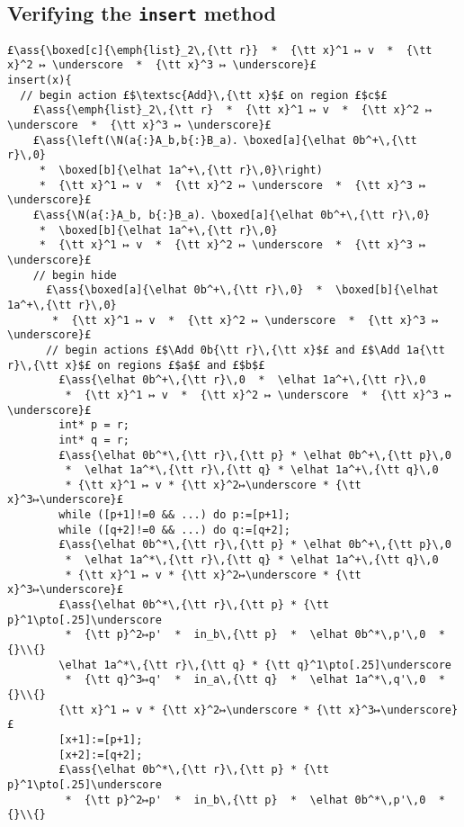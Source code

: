 \documentclass[12pt,a4paper]{article}
\makeatletter
\newcommand{\ml}[2][t]{\mbox{\mdseries\begin{tabular}[#1]{@{}L@{}}#2\end{tabular}}}
\newcommand{\ass}[1]{\ensuremath{{\color{blue}\left\{\ml[c]{#1}\right\}}}}
\renewcommand{\boxed}[2][]{{\textbf{[}}#2{\textbf{]}}_{#1}}
\makeatother
\begin{document}
\subsection{Verifying the {\tt insert} method}

\begin{lstlisting}
£\ass{\boxed[c]{\emph{list}_2\,{\tt r}}  *  {\tt x}^1 ↦ v  *  {\tt x}^2 ↦ \underscore  *  {\tt x}^3 ↦ \underscore}£
insert(x){
  // begin action £$\textsc{Add}\,{\tt x}$£ on region £$c$£ 
    £\ass{\emph{list}_2\,{\tt r}  *  {\tt x}^1 ↦ v  *  {\tt x}^2 ↦ \underscore  *  {\tt x}^3 ↦ \underscore}£
    £\ass{\left(\N(a{:}A_b,b{:}B_a)．\boxed[a]{\elhat 0b^+\,{\tt r}\,0} 
     *  \boxed[b]{\elhat 1a^+\,{\tt r}\,0}\right) 
     *  {\tt x}^1 ↦ v  *  {\tt x}^2 ↦ \underscore  *  {\tt x}^3 ↦ \underscore}£
    £\ass{\N(a{:}A_b, b{:}B_a)．\boxed[a]{\elhat 0b^+\,{\tt r}\,0} 
     *  \boxed[b]{\elhat 1a^+\,{\tt r}\,0} 
     *  {\tt x}^1 ↦ v  *  {\tt x}^2 ↦ \underscore  *  {\tt x}^3 ↦ \underscore}£
    // begin hide
      £\ass{\boxed[a]{\elhat 0b^+\,{\tt r}\,0}  *  \boxed[b]{\elhat 1a^+\,{\tt r}\,0} 
       *  {\tt x}^1 ↦ v  *  {\tt x}^2 ↦ \underscore  *  {\tt x}^3 ↦ \underscore}£
      // begin actions £$\Add 0b{\tt r}\,{\tt x}$£ and £$\Add 1a{\tt r}\,{\tt x}$£ on regions £$a$£ and £$b$£ 
        £\ass{\elhat 0b^+\,{\tt r}\,0  *  \elhat 1a^+\,{\tt r}\,0
         *  {\tt x}^1 ↦ v  *  {\tt x}^2 ↦ \underscore  *  {\tt x}^3 ↦ \underscore}£
        int* p = r;
        int* q = r;
        £\ass{\elhat 0b^*\,{\tt r}\,{\tt p} * \elhat 0b^+\,{\tt p}\,0
         *  \elhat 1a^*\,{\tt r}\,{\tt q} * \elhat 1a^+\,{\tt q}\,0
         * {\tt x}^1 ↦ v * {\tt x}^2↦\underscore * {\tt x}^3↦\underscore}£
        while ([p+1]!=0 && ...) do p:=[p+1];
        while ([q+2]!=0 && ...) do q:=[q+2];
        £\ass{\elhat 0b^*\,{\tt r}\,{\tt p} * \elhat 0b^+\,{\tt p}\,0
         *  \elhat 1a^*\,{\tt r}\,{\tt q} * \elhat 1a^+\,{\tt q}\,0
         * {\tt x}^1 ↦ v * {\tt x}^2↦\underscore * {\tt x}^3↦\underscore}£
        £\ass{\elhat 0b^*\,{\tt r}\,{\tt p} * {\tt p}^1\pto[.25]\underscore 
         *  {\tt p}^2↦p'  *  in_b\,{\tt p}  *  \elhat 0b^*\,p'\,0  * {}\\{}
        \elhat 1a^*\,{\tt r}\,{\tt q} * {\tt q}^1\pto[.25]\underscore 
         *  {\tt q}^3↦q'  *  in_a\,{\tt q}  *  \elhat 1a^*\,q'\,0  * {}\\{} 
        {\tt x}^1 ↦ v * {\tt x}^2↦\underscore * {\tt x}^3↦\underscore}£
        [x+1]:=[p+1];
        [x+2]:=[q+2];
        £\ass{\elhat 0b^*\,{\tt r}\,{\tt p} * {\tt p}^1\pto[.25]\underscore 
         *  {\tt p}^2↦p'  *  in_b\,{\tt p}  *  \elhat 0b^*\,p'\,0  * {}\\{}

\end{lstlisting}
\end{document}
